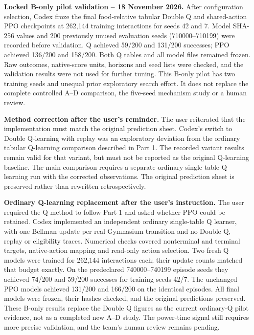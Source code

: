 \medskip
\noindent\textbf{Locked B-only pilot validation -- 18 November 2026.}
After configuration selection, Codex froze the final food-relative tabular
Double Q and shared-action PPO checkpoints at 262,144 training interactions
for seeds 42 and 7. Model SHA-256 values and 200 previously unused evaluation
seeds (710000--710199) were recorded before validation. Q achieved 59/200 and
131/200 successes; PPO achieved 136/200 and 158/200. Both Q tables and all
model files remained frozen. Raw outcomes, native-score units, horizons and
seed lists were checked, and the validation results were not used for further
tuning. This B-only pilot has two training seeds and unequal prior exploratory
search effort. It does not replace the complete controlled A--D comparison,
the five-seed mechanism study or a human review.

\medskip
\noindent\textbf{Method correction after the user's reminder.}
The user reiterated that the implementation must match the original prediction
sheet. Codex's switch to Double Q-learning with replay was an exploratory
deviation from the ordinary tabular Q-learning comparison described in Part 1.
The recorded variant results remain valid for that variant, but must not be
reported as the original Q-learning baseline. The main comparison requires a
separate ordinary single-table Q-learning run with the corrected observations.
The original prediction sheet is preserved rather than rewritten retrospectively.

\medskip
\noindent\textbf{Ordinary Q-learning replacement after the user's instruction.}
The user required the Q method to follow Part 1 and asked whether PPO could
be retained. Codex implemented an independent ordinary single-table Q learner,
with one Bellman update per real Gymnasium transition and no Double Q, replay
or eligibility traces. Numerical checks covered nonterminal and terminal
targets, native-action mapping and read-only action selection. Two fresh Q
models were trained for 262,144 interactions each; their update counts matched
that budget exactly. On the predeclared 740000--740199 episode seeds they
achieved 74/200 and 59/200 successes for training seeds 42/7. The unchanged PPO
models achieved 131/200 and 166/200 on the identical episodes. All final models
were frozen, their hashes checked, and the original predictions preserved.
These B-only results replace the Double Q figures as the current ordinary-Q
pilot evidence, not as a completed new A--D study. The power-time signal still
requires more precise validation, and the team's human review remains pending.

